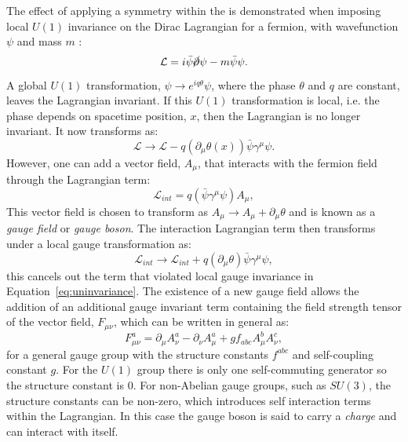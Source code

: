 The effect of applying a symmetry within the \SM is demonstrated when
imposing local $U(1)$ invariance on the Dirac Lagrangian for a
fermion, with wavefunction $\psi$ and mass $m$ \cite{Griffiths:111880}:
\begin{equation}
\mathcal{L}=i\bar{\psi}\cancel{\partial}\psi-m\bar{\psi}\psi.
\end{equation}
A global $U(1)$ transformation, $\psi\rightarrow e^{iq\theta}\psi$,
where the phase $\theta$ and $q$ are constant,
leaves the Lagrangian invariant. If this $U(1)$ transformation is
local, i.e. the phase depends on spacetime position, $x$, then the
Lagrangian is no longer invariant. It now transforms as:
\begin{equation}
\label{eq:uninvariance}
\mathcal{L}\rightarrow\mathcal{L}-q(\partial_{\mu}\theta(x))\bar{\psi}\gamma^{\mu}\psi.
\end{equation}
However, one can add a vector field, $A_{\mu}$, that interacts with
the fermion field through the Lagrangian term:
\begin{equation}
\mathcal{L}_{int}=q(\bar{\psi}\gamma^{\mu}\psi) A_{\mu},
\end{equation}
This vector field is chosen to transform as $A_{\mu}\rightarrow
A_{\mu}+\partial_{\mu}\theta$ and is known as a \emph{gauge field} or
\emph{gauge boson}. The interaction Lagrangian term then transforms
under a local gauge transformation as:
\begin{equation}
\mathcal{L}_{int}\rightarrow \mathcal{L}_{int}+q(\partial_{\mu}\theta)\bar{\psi}\gamma^{\mu}\psi,
\end{equation}
this cancels out the term that violated local gauge invariance in
Equation~\ref{eq:uninvariance}. The existence of a new gauge field
allows the addition of an additional gauge invariant term containing
the field strength tensor of the vector field, $F_{\mu\nu}$, which can
be written in general as:
\begin{equation}
F_{\mu\nu}^a=\partial_{\mu}A_{\nu}^a-\partial_{\nu}A_{\mu}^a+gf_{abc}A_{\mu}^{b}A_{\nu}^{c},
\end{equation}
for a general gauge group with the structure constants $f^{abc}$ and
self-coupling constant $g$. For
the $U(1)$ group there is only one self-commuting generator so the
structure constant is 0. For non-Abelian gauge groups, such as
$SU(3)$, the structure constants can be non-zero, which introduces
self interaction terms within the Lagrangian. In this case the gauge
boson is said to carry a \emph{charge} and can interact with itself.

